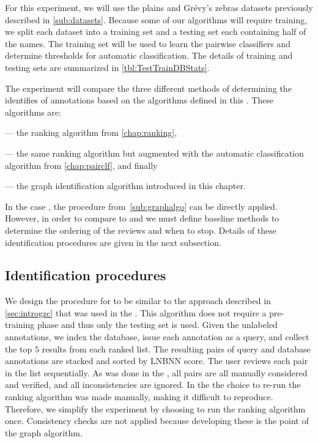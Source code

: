     For this experiment, we will use the plains and Grévy's zebras datasets previously described in
      \cref{sub:datasets}.
    Because some of our algorithms will require training, we split each dataset into a training set and a testing
      set each containing half of the names.
    The training set will be used to learn the pairwise classifiers and determine thresholds for automatic
      classification.
    The details of training and testing sets are summarized in \cref{tbl:TestTrainDBStats}.
    \TestTrainDBStats{}
    \FloatBarrier{}

    The experiment will compare the three different methods of determining the identifies of annotations based on
      the algorithms defined in this \thesis{}.
    These algorithms are:
    \begin{enumin}

    \item {} --- the ranking algorithm from \cref{chap:ranking}, 

    \item {} --- the same
        ranking algorithm but augmented with the automatic classification algorithm from \cref{chap:pairclf}, and
        finally

    \item {} --- the graph identification algorithm introduced in this chapter.

    \end{enumin}
    In the case , the procedure from~\cref{sub:graphalgo} can be directly applied.
    However, in order to compare  to  and  we must define baseline
      methods to determine the ordering of the reviews and when to stop.
    Details of these identification procedures are given in the next subsection.

    \FloatBarrier{}
    \subsection{Identification procedures}

    We design the procedure for  to be similar to the approach described in \cref{sec:introgzc}
      that was used in the \GZC{}.
    This algorithm does not require a pre-training phase and thus only the testing set is used.
    Given the unlabeled annotations, we index the database, issue each annotation as a query, and collect the top
      $5$ results from each ranked list.
    The resulting pairs of query and database annotations are stacked and sorted by LNBNN score.
    The user reviews each pair in the list sequentially.
    As was done in the \GZC{}, all pairs are all manually considered and verified, and all inconsistencies are
      ignored.
    In the \GZC{} the choice to re-run the ranking algorithm was made manually, making it difficult to reproduce.
    Therefore, we simplify the experiment by choosing to run the ranking algorithm once.
    Consistency checks are not applied because developing these is the point of the graph algorithm.

